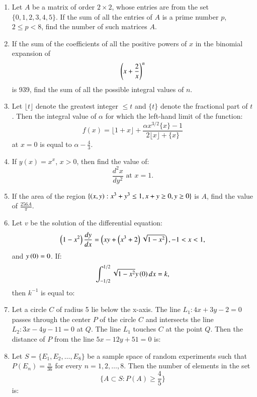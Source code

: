\documentclass[journal,12pt,twocolumn]{IEEEtran}
\theoremstyle{remark}
\begin{document}
\begin{enumerate}
    \item Let $ A $ be a matrix of order $ 2 \times 2 $, whose entries are from the set $ \{0, 1, 2, 3, 4, 5\} $. If the sum of all the entries of $ A $ is a prime number $ p $, $ 2 \leq p < 8 $, find the number of such matrices $ A $.

    \item If the sum of the coefficients of all the positive powers of $ x $ in the binomial expansion of 
    \[
    \left(x + \frac{2}{x}\right)^n
    \]
    is 939, find the sum of all the possible integral values of $ n $.


    \item Let $ \lfloor t \rfloor $ denote the greatest integer $ \leq t $ and $ \{ t \} $ denote the fractional part of $ t $. Then the integral value of $ \alpha $ for which the left-hand limit of the function:
    \[
    f(x) = \lfloor 1 + x \rfloor + \frac{\alpha x^{3/2} \{ x \} - 1}{2 \lfloor x \rfloor + \{ x \}}
    \]
    at $ x = 0 $ is equal to $ \alpha - \frac{4}{3} $.

    \item If $ y(x) = x^x $, $ x > 0 $, then find the value of:
    \[
    \frac{d^2x}{dy^2} \text{ at } x = 1.
    \]

    \item If the area of the region $ \{ \left(x, y\right): x^3 + y^3 \leq 1, x + y \geq 0, y \geq 0 \} $ is $ A $, find the value of $ \frac{256A}{\pi} $.

    \item Let $ v $ be the solution of the differential equation:
    \[
    \left(1 - x^2\right) \frac{dy}{dx} = \left(xy + \left(x^3 + 2\right)\sqrt{1 - x^2}\right), -1 < x < 1,
    \]
    and $ y\left(0\right) = 0 $. If:
    \[
    \int_{-1/2}^{1/2} \sqrt{1 - x^2} y\left(0\right) dx = k,
    \]
    then $ k^{-1} $ is equal to:

    \item Let a circle $ C $ of radius 5 lie below the x-axis. The line $ L_1: 4x + 3y - 2 = 0 $ passes through the center $ P $ of the circle $ C $ and intersects the line $ L_2: 3x - 4y - 11 = 0 $ at $ Q $. The line $ L_1 $ touches $ C $ at the point $ Q $. Then the distance of $ P $ from the line $ 5x - 12y + 51 = 0 $ is:
    
    \item Let $ S = \{ E_1, E_2, \dots, E_8 \} $ be a sample space of random experiments such that $ P(E_n) = \frac{n}{36} $ for every $ n = 1, 2, \dots, 8 $. Then the number of elements in the set 
    \[
    \{ A \subset S : P(A) \geq \frac{4}{5} \}
    \]
    is:
   

    
\end{enumerate}
\end{document}
